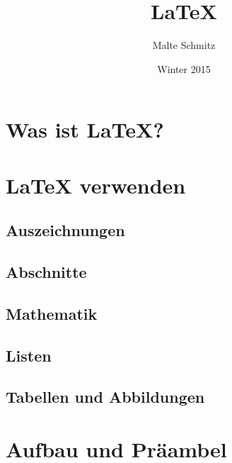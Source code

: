 \documentclass[xcolor=table]{beamer}
\author{Malte Schmitz}
\title{LaTeX}
\institute{Institut für Softwaretechnik und Programmiersprachen}
\date{Winter 2015}
\begin{document}


\section{Was ist \LaTeX?}

\section{\LaTeX{} verwenden}
\subsection{Auszeichnungen}

\subsection{Abschnitte}
\subsection{Mathematik}
\subsection{Listen}
\subsection{Tabellen und Abbildungen}
\section{Aufbau und Präambel}


\end{document}
